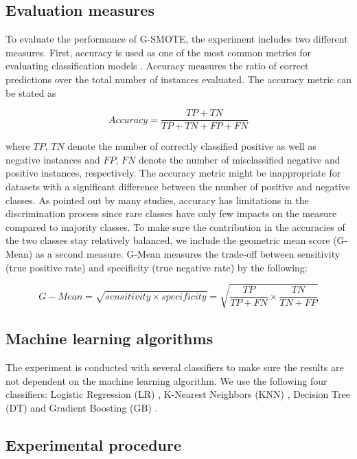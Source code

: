 \documentclass[parskip=full]{scrartcl}
\begin{document}
\subsection{Evaluation measures}

To evaluate the performance of G-SMOTE, the experiment includes two different
measures. First, accuracy is used as one of the most common metrics for
evaluating classification models \cite{M.2015}. Accuracy measures the ratio of
correct predictions over the total number of instances evaluated. The accuracy
metric can be stated as

$$Accuracy = \frac{TP + TN}{TP +TN + FP + FN}$$

where \( TP \), \( TN \) denote the number of correctly classified positive as
well as negative instances and \(FP \), \( FN\) denote the number of
misclassified negative and positive instances, respectively. The accuracy metric
might be inappropriate for datasets with a significant difference between the
number of positive and negative classes. As pointed out by many studies,
accuracy has limitations in the discrimination process since rare classes have
only few impacts on the measure compared to majority classes. To make sure the
contribution in the accuracies of the two classes stay relatively balanced, we
include the geometric mean score (G-Mean) as a second measure. G-Mean measures
the trade-off between sensitivity (true positive rate) and specificity (true
negative rate) by the following:

$$G-Mean = \sqrt{sensitivity \times specificity} = \sqrt{\dfrac{TP}{TP + FN} 
\times \dfrac{TN}{TN + FP}}$$

\subsection{Machine learning algorithms}

The experiment is conducted with several classifiers to make sure the results
are not dependent on the machine learning algorithm. We use the following four
classifiers: Logistic Regression (LR) \cite{McCullagh.2019}, K-Nearest Neighbors
(KNN) \cite{Cover.1967}, Decision Tree (DT) \cite{Salzberg.1994} and Gradient
Boosting (GB) \cite{Friedman.2001}.

\subsection{Experimental procedure}
\end{document}
